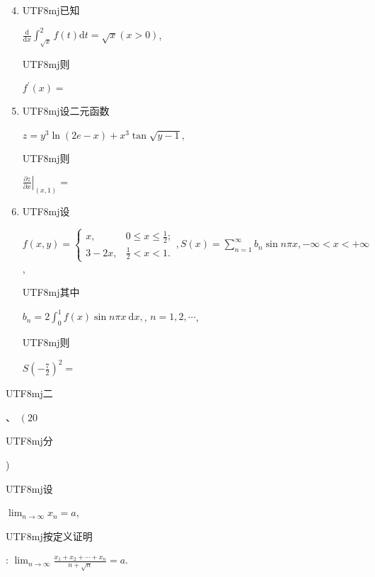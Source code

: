 \documentclass[10pt]{article}
\begin{document}
\begin{enumerate}
  \setcounter{enumi}{3}
  \item \begin{CJK}{UTF8}{mj}已知\end{CJK} $\frac{\mathrm{d}}{\mathrm{d} x} \int_{\sqrt{x}}^{2} f(t) \mathrm{d} t=\sqrt{x}(x>0)$, \begin{CJK}{UTF8}{mj}则\end{CJK} $f^{\prime}(x)=$

  \item \begin{CJK}{UTF8}{mj}设二元函数\end{CJK} $z=y^{3} \ln (2 e-x)+x^{3} \tan \sqrt{y-1}$, \begin{CJK}{UTF8}{mj}则\end{CJK} $\left.\frac{\partial z}{\partial x}\right|_{(x, 1)}=$

  \item \begin{CJK}{UTF8}{mj}设\end{CJK} $f(x, y)=\left\{\begin{array}{ll}x, & 0 \leqslant x \leqslant \frac{1}{2} ; \\ 3-2 x, & \frac{1}{2}<x<1 .\end{array}, S(x)=\sum_{n=1}^{\infty} b_{n} \sin n \pi x,-\infty<x<+\infty\right.$, \begin{CJK}{UTF8}{mj}其中\end{CJK} $b_{n}=2 \int_{0}^{1} f(x) \sin n \pi x \mathrm{~d} x,$, $n=1,2, \cdots$, \begin{CJK}{UTF8}{mj}则\end{CJK} $S\left(-\frac{7}{2}\right)^{2}=$

\end{enumerate}
\begin{CJK}{UTF8}{mj}二\end{CJK}、 $\left(20\right.$ \begin{CJK}{UTF8}{mj}分\end{CJK} ) \begin{CJK}{UTF8}{mj}设\end{CJK} $\lim _{n \rightarrow \infty} x_{n}=a$, \begin{CJK}{UTF8}{mj}按定义证明\end{CJK}: $\lim _{n \rightarrow \infty} \frac{x_{1}+x_{2}+\cdots+x_{n}}{n+\sqrt{n}}=a$.
\end{document}
